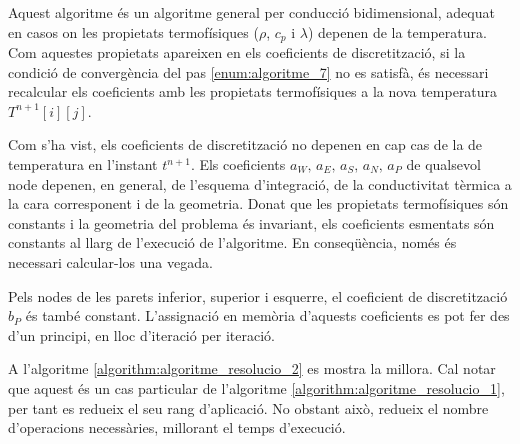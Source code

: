 Aquest algoritme és un algoritme general per conducció bidimensional, adequat en casos on les propietats termofísiques ($\rho$, $c_p$ i $\lambda$) depenen de la temperatura. Com aquestes propietats apareixen en els coeficients de discretització, si la condició de convergència del pas \ref{enum:algoritme_7} no es satisfà, és necessari recalcular els coeficients amb les propietats termofísiques a la nova temperatura $T^{n+1}[i][j]$.

Com s'ha vist, els coeficients de discretització no depenen en cap cas de la de temperatura en l'instant $t^{n+1}$. Els coeficients $a_W, \, a_E, \, a_S, \, a_N, \, a_P$ de qualsevol node depenen, en general, de l'esquema d'integració, de la conductivitat tèrmica a la cara corresponent i de la geometria. Donat que les propietats termofísiques són constants i la geometria del problema és invariant, els coeficients esmentats són constants al llarg de l'execució de l'algoritme. En conseqüència, només és necessari calcular-los una vegada.

Pels nodes de les parets inferior, superior i esquerre, el coeficient de discretització $b_P$ és també constant. L'assignació en memòria d'aquests coeficients es pot fer des d'un principi, en lloc d'iteració per iteració. 

A l'algoritme \ref{algorithm:algoritme_resolucio_2} es mostra la millora. Cal notar que aquest és un cas particular de l'algoritme \ref{algorithm:algoritme_resolucio_1}, per tant es redueix el seu rang d'aplicació. No obstant això, redueix el nombre d'operacions necessàries, millorant el temps d'execució.


